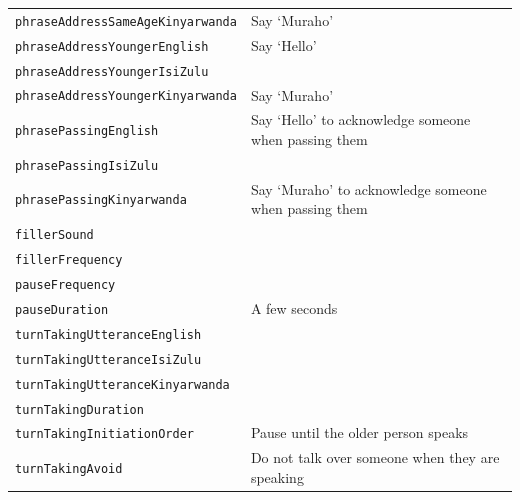 \documentclass{CSSRforAfrica}
\begin{document}
\begin{table}[H]
\begin{center}
\begin{tabular}{|l l|}
{\footnotesize \verb+phraseAddressSameAgeKinyarwanda+}     & {\footnotesize Say `Muraho' } \vspace{-1mm}\\
{\footnotesize \verb+phraseAddressYoungerEnglish+}     & {\footnotesize   Say  `Hello'} \vspace{-1mm}\\
{\footnotesize \verb+phraseAddressYoungerIsiZulu+}     & {\footnotesize  } \vspace{-1mm}\\
{\footnotesize \verb+phraseAddressYoungerKinyarwanda+}     & {\footnotesize  Say `Muraho' } \vspace{-1mm}\\
{\footnotesize \verb+phrasePassingEnglish+}     & {\footnotesize  Say  `Hello' to acknowledge someone when passing them } \vspace{-1mm}\\
{\footnotesize \verb+phrasePassingIsiZulu+}     & {\footnotesize } \vspace{-1mm}\\
{\footnotesize \verb+phrasePassingKinyarwanda+}     & {\footnotesize  Say `Muraho'  to acknowledge someone when passing them } \vspace{-1mm}\\
{\footnotesize \verb+fillerSound+} 	                   & {\footnotesize  } \vspace{-1mm}\\
{\footnotesize \verb+fillerFrequency+} 	                   & {\footnotesize  } \vspace{-1mm}\\
{\footnotesize \verb+pauseFrequency+} 	           & {\footnotesize  } \vspace{-1mm}\\
{\footnotesize \verb+pauseDuration+} 	                    & {\footnotesize   A few seconds}\vspace{-1mm} \\
{\footnotesize \verb+turnTakingUtteranceEnglish+} 	            & {\footnotesize   }\\
{\footnotesize \verb+turnTakingUtteranceIsiZulu+} 	            & {\footnotesize   }\\
{\footnotesize \verb+turnTakingUtteranceKinyarwanda+} 	            & {\footnotesize   }\\
{\footnotesize \verb+turnTakingDuration+}            & {\footnotesize  } \vspace{-1mm}\\
{\footnotesize \verb+turnTakingInitiationOrder+}            & {\footnotesize   Pause until the older person speaks} \vspace{-1mm}\\
{\footnotesize \verb+turnTakingAvoid+}            & {\footnotesize   Do not talk over someone when they are speaking} \vspace{-1mm}\\


\end{tabular}
\end{center}
\end{table}
\end{document}
